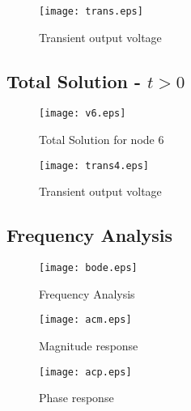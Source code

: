 \begin{figure}[h] \centering
\texttt{[image: trans.eps]}
\caption{Transient output voltage}
\label{fig:trans}
\end{figure}

\newpage

\subsection{Total Solution - $t>0$}

\begin{figure}[h] \centering
\texttt{[image: v6.eps]}
\caption{Total Solution for node 6}
\label{fig:total}
\end{figure}

\begin{figure}[h] \centering
\texttt{[image: trans4.eps]}
\caption{Transient output voltage}
\label{fig:trans4}
\end{figure}


\newpage

\subsection{Frequency Analysis}

\begin{figure}[h] \centering
\texttt{[image: bode.eps]}
\caption{Frequency Analysis}
\label{fig:frequency}
\end{figure}

\begin{figure}[h] \centering
\texttt{[image: acm.eps]}
\caption{Magnitude response}
\label{fig:acm}
\end{figure}

\begin{figure}[h] \centering
\texttt{[image: acp.eps]}
\caption{Phase response}
\label{fig:acp}
\end{figure}

